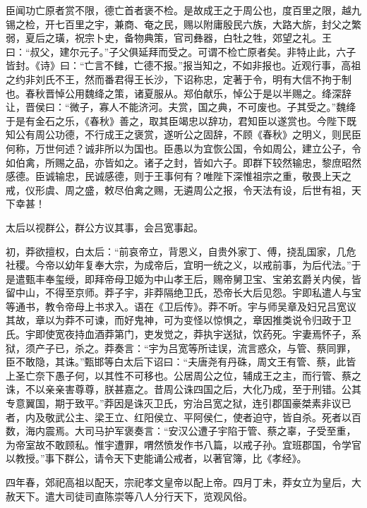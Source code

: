 \documentclass[12pt,UTF8]{ctexbook}
\begin{document}
臣闻功亡原者赏不限，德亡首者褒不检。是故成王之于周公也，度百里之限，越九锡之检，开七百里之宇，兼商、奄之民，赐以附庸殷民六族，大路大旂，封父之繁弱，夏后之璜，祝宗卜史，备物典策，官司彝器，白牡之牲，郊望之礼。王曰：“叔父，建尔元子。”子父俱延拜而受之。可谓不检亡原者矣。非特止此，六子皆封。《诗》曰：“亡言不雠，亡德不报。”报当知之，不如非报也。近观行事，高祖之约非刘氏不王，然而番君得王长沙，下诏称忠，定著于令，明有大信不拘于制也。春秋晋悼公用魏绛之策，诸夏服从。郑伯献乐，悼公于是以半赐之。绛深辞让，晋侯曰：“微子，寡人不能济河。夫赏，国之典，不可废也。子其受之。”魏绛于是有金石之乐，《春秋》善之，取其臣竭忠以辞功，君知臣以遂赏也。今陛下既知公有周公功德，不行成王之褒赏，遂听公之固辞，不顾《春秋》之明义，则民臣何称，万世何述？诚非所以为国也。臣愚以为宜恢公国，令如周公，建立公子，令如伯禽，所赐之品，亦皆如之。诸子之封，皆如六子。即群下较然输忠，黎庶昭然感德。臣诚输忠，民诚感德，则于王事何有？唯陛下深惟祖宗之重，敬畏上天之戒，仪形虞、周之盛，敕尽伯禽之赐，无遴周公之报，令天法有设，后世有祖，天下幸甚！



太后以视群公，群公方议其事，会吕宽事起。



初，莽欲擅权，白太后：“前哀帝立，背恩义，自贵外家丁、傅，挠乱国家，几危社稷。今帝以幼年复奉大宗，为成帝后，宜明一统之义，以戒前事，为后代法。”于是遣甄丰奉玺绶，即拜帝母卫姬为中山孝王后，赐帝舅卫宝、宝弟玄爵关内侯，皆留中山，不得至京师。莽子宇，非莽隔绝卫氏，恐帝长大后见怨。宇即私遣人与宝等通书，教令帝母上书求入。语在《卫后传》。莽不听。宇与师吴章及妇兄吕宽议其故，章以为莽不可谏，而好鬼神，可为变怪以惊惧之，章因推类说令归政于卫氏。宇即使宽夜持血酒莽第门，吏发觉之，莽执宇送狱，饮药死。宇妻焉怀子，系狱，须产子已，杀之。莽奏言：“宇为吕宽等所诖误，流言惑众，与管、蔡同罪，臣不敢隐，其诛。”甄邯等白太后下诏曰：“夫唐尧有丹硃，周文王有管、蔡，此皆上圣亡奈下愚子何，以其性不可移也。公居周公之位，辅成王之主，而行管、蔡之诛，不以亲亲害尊尊，朕甚嘉之。昔周公诛四国之后，大化乃成，至于刑错。公其专意翼国，期于致平。”莽因是诛灭卫氏，穷治吕宽之狱，连引郡国豪桀素非议已者，内及敬武公主、梁王立、红阳侯立、平阿侯仁，使者迫守，皆自杀。死者以百数，海内震焉。大司马护军褒奏言：“安汉公遭子宇陷于管、蔡之辜，子受至重，为帝室故不敢顾私。惟宇遭罪，喟然愤发作书八篇，以戒子孙。宜班郡国，令学官以教授。”事下群公，请令天下吏能诵公戒者，以著官簿，比《孝经》。



四年春，郊祀高祖以配天，宗祀孝文皇帝以配上帝。四月丁未，莽女立为皇后，大赦天下。遣大司徒司直陈崇等八人分行天下，览观风俗。
\end{document}
